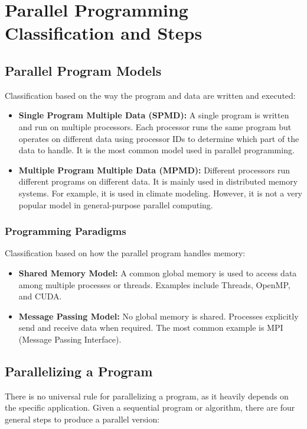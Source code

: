 \documentclass[12pt]{book}
\begin{document}
\chapter{Parallel Programming Classification and Steps}

\section{Parallel Program Models}
Classification based on the way the program and data are written and executed:
\begin{itemize}
    \item \textbf{Single Program Multiple Data (SPMD):} A single program is written and run on multiple processors. Each processor runs the same program but operates on different data using processor IDs to determine which part of the data to handle. It is the most common model used in parallel programming.
    
    \item \textbf{Multiple Program Multiple Data (MPMD):} Different processors run different programs on different data. It is mainly used in distributed memory systems. For example, it is used in climate modeling. However, it is not a very popular model in general-purpose parallel computing.
\end{itemize}

\subsection{Programming Paradigms}
Classification based on how the parallel program handles memory:

\begin{itemize}
    \item \textbf{Shared Memory Model:} A common global memory is used to access data among multiple processes or threads. Examples include Threads, OpenMP, and CUDA.
    
    \item \textbf{Message Passing Model:} No global memory is shared. Processes explicitly send and receive data when required. The most common example is MPI (Message Passing Interface).
\end{itemize}

\section{Parallelizing a Program}

There is no universal rule for parallelizing a program, as it heavily depends on the specific application. Given a sequential program or algorithm, there are four general steps to produce a parallel version:
\end{document}
